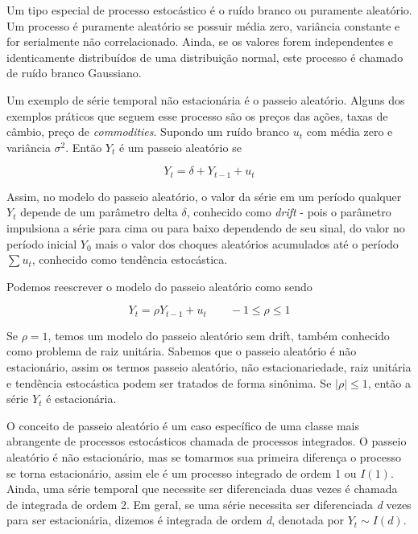 \documentclass[twocolumn]{rbef}
\newcommand{\1}{\mathbbm{1}}
\begin{document}
Um tipo especial de processo estocástico é o ruído branco ou puramente aleatório. Um processo é puramente aleatório se possuir média zero, variância constante e for serialmente não correlacionado. Ainda, se os valores forem independentes e identicamente distribuídos de uma distribuição normal, este processo é chamado de ruído branco Gaussiano.

Um exemplo de série temporal não estacionária é o passeio aleatório. Alguns dos exemplos práticos que seguem esse processo são os preços das ações, taxas de câmbio, preço de \textit{commodities}. Supondo um ruído branco $u_{t}$ com média zero e variância $\sigma^{2}$. Então $Y_{t}$ é um passeio aleatório se

\begin{equation}
Y_{t} = \delta + Y_{t-1} + u_{t}
\end{equation}

Assim, no modelo do passeio aleatório, o valor da série em um período qualquer $Y_{t}$ depende de um parâmetro delta $\delta$, conhecido como \textit{drift} - pois o parâmetro impulsiona a série para cima ou para baixo dependendo de seu sinal, do valor no período inicial $Y_{0}$ mais o valor dos choques aleatórios acumulados até o período $\sum u_{t}$, conhecido como tendência estocástica.

Podemos reescrever o modelo do passeio aleatório como sendo

\begin{equation} \label{unit_root_eq}
    Y_{t} = \rho Y_{t-1} + u_{t} \qquad -1 \leq \rho \leq 1
\end{equation}

Se $\rho = 1$, temos um modelo do passeio aleatório sem drift, também conhecido como problema de raiz unitária. Sabemos que o passeio aleatório é não estacionário, assim os termos passeio aleatório, não estacionariedade, raiz unitária e tendência estocástica podem ser tratados de forma sinônima. Se $|\rho| \leq 1$, então a série $Y_{t}$ é estacionária.

O conceito de passeio aleatório é um caso específico de uma classe mais abrangente de processos estocásticos chamada de processos integrados. O passeio aleatório é não estacionário, mas se tomarmos sua primeira diferença o processo se torna estacionário, assim ele é um processo integrado de ordem 1 ou $I(1)$. Ainda, uma série temporal que necessite ser diferenciada duas vezes é chamada de integrada de ordem 2. Em geral, se uma série necessita ser diferenciada \textit{d} vezes para ser estacionária, dizemos é integrada de ordem \textit{d}, denotada por $Y_{t} \sim I(d)$.
\end{document}
